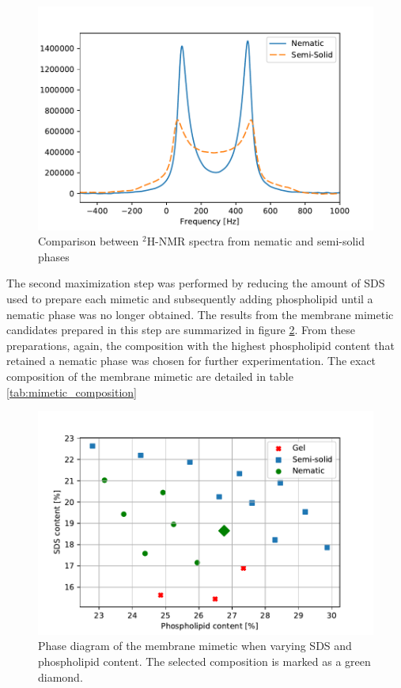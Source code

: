 \documentclass[9pt]{article}
\begin{document}
\begin{figure}[h]
\centering
  \includegraphics[width=\columnwidth]{nematic_v_semisolid}
  \caption{Comparison between $^2$H-NMR spectra from nematic and semi-solid phases}
  \label{fig:22v23}
\end{figure}

The second maximization step was performed by reducing the amount of SDS used to
prepare each mimetic and subsequently adding phospholipid until a nematic phase
was no longer obtained. The results from the membrane mimetic candidates
prepared in this step are summarized in figure \ref{fig:phase_diag}. From these
preparations, again, the composition with the highest phospholipid content that
retained a nematic phase was chosen for further experimentation. The exact
composition of the membrane mimetic are detailed in table \ref{tab:mimetic_composition}

\begin{figure}[h]
\centering
  \includegraphics[width=\columnwidth]{phase_diag}
  \caption{Phase diagram of the membrane mimetic when varying SDS and
    phospholipid content. The selected composition is marked as a green diamond.}
  \label{fig:phase_diag}
\end{figure}
\end{document}
